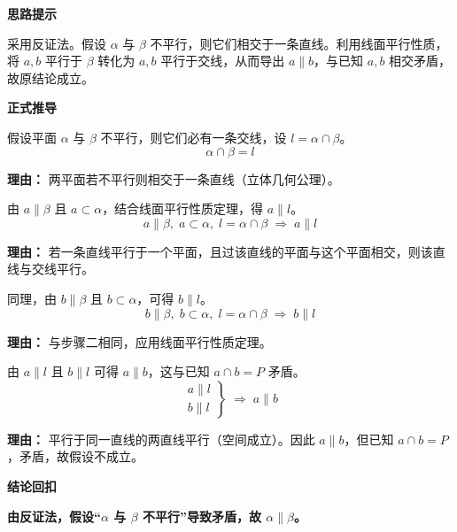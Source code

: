 \begin{proofbox}
	\textbf{\textcolor{CProof}{思路提示}}

	采用反证法。假设 $\alpha$ 与 $\beta$ 不平行，则它们相交于一条直线。利用线面平行性质，将 $a,b$ 平行于 $\beta$ 转化为 $a,b$ 平行于交线，从而导出 $a\parallel b$，与已知 $a,b$ 相交矛盾，故原结论成立。

	\medskip
	\textbf{\textcolor{CProof}{正式推导}}
	\begin{description}[style=nextline, leftmargin=2.8em, labelsep=0.5em, itemsep=0.55em]
		\item[\textbf{步骤一（假设相交）：}] 假设平面 $\alpha$ 与 $\beta$ 不平行，则它们必有一条交线，设 $l=\alpha\cap\beta$。
			\[
				\alpha\cap\beta = l
			\]
			\par\textbf{理由：}
			两平面若不平行则相交于一条直线（立体几何公理）。

		\item[\textbf{步骤二（$a\parallel l$）：}] 由 $a\parallel\beta$ 且 $a\subset\alpha$，结合线面平行性质定理，得 $a\parallel l$。
			\[
				a\parallel\beta,\; a\subset\alpha,\; l=\alpha\cap\beta \;\Longrightarrow\; a\parallel l
			\]
			\par\textbf{理由：}
			若一条直线平行于一个平面，且过该直线的平面与这个平面相交，则该直线与交线平行。

		\item[\textbf{步骤三（$b\parallel l$）：}] 同理，由 $b\parallel\beta$ 且 $b\subset\alpha$，可得 $b\parallel l$。
			\[
				b\parallel\beta,\; b\subset\alpha,\; l=\alpha\cap\beta \;\Longrightarrow\; b\parallel l
			\]
			\par\textbf{理由：}
			与步骤二相同，应用线面平行性质定理。

		\item[\textbf{步骤四（导出矛盾）：}] 由 $a\parallel l$ 且 $b\parallel l$ 可得 $a\parallel b$，这与已知 $a\cap b=P$ 矛盾。
			\[
				\left.\begin{array}{l}
				a\parallel l\\
				b\parallel l
		\end{array}\right\} \;\Longrightarrow\; a\parallel b
		\]
		\par\textbf{理由：}
		平行于同一直线的两直线平行（空间成立）。因此 $a\parallel b$，但已知 $a\cap b=P$，矛盾，故假设不成立。
\end{description}

\medskip
\textbf{\textcolor{CProof}{结论回扣}}

\textbf{由反证法，假设“$\alpha$ 与 $\beta$ 不平行”导致矛盾，故 $\alpha\parallel\beta$。}
\end{proofbox}
